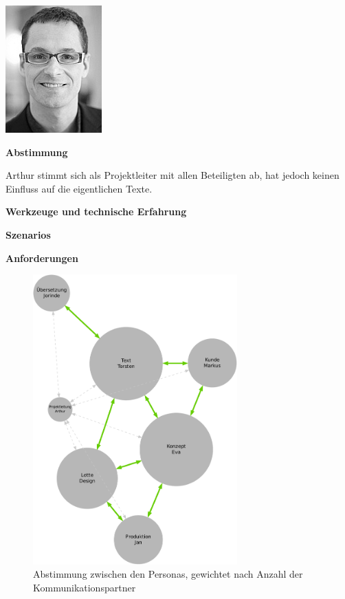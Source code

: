 \begin{multicols}{2}

\begin{center}
\includegraphics[width=0.5\columnwidth]{media/arthur.jpg}
\end{center}


\textbf{Abstimmung}

Arthur stimmt sich als Projektleiter mit allen Beteiligten ab, hat jedoch keinen Einfluss auf die eigentlichen Texte.

\textbf{Werkzeuge und technische Erfahrung}

\columnbreak

\textbf{Szenarios}

\textbf{Anforderungen}

\end{multicols}

\pagebreak

\begin{figure}[htb]
\begin{center}
\includegraphics[width=0.7\textwidth]{media/personas-gewichtet.pdf}
\caption{Abstimmung zwischen den Personas, gewichtet nach Anzahl der Kommunikationspartner}
\label{chart:personas-gewichtet}
\end{center}
\end{figure}